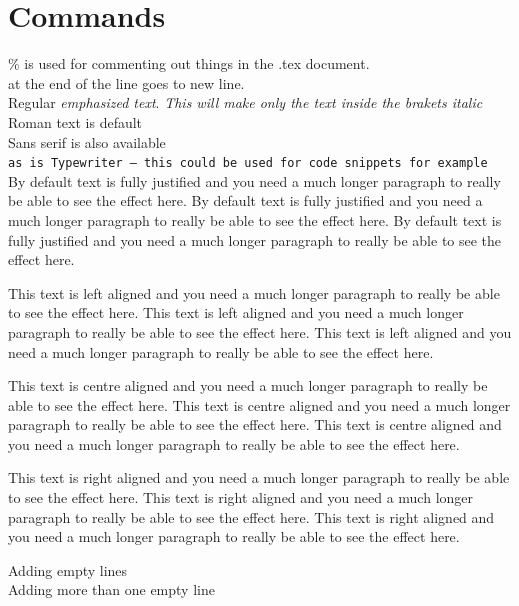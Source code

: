 \documentclass[16pt,a4paper]{article}
\begin{document}
\section{Commands}
\% is used for commenting out things in the .tex document.
\\ at the end of the line goes to new line. \\
Regular \emph{emphasized text}.
\textit{This will make only the \emph{text} inside the brakets italic}\\
\textrm{Roman text is default}\\ 
\textsf{Sans serif is also available}\\ 
\texttt{as is Typewriter – this could be used for code snippets for example}\\
By default text is fully justified and you need a much longer paragraph to really be able to see the effect here.
By default text is fully justified and you need a much longer paragraph to really be able to see the effect here.
By default text is fully justified and you need a much longer paragraph to really be able to see the effect here.
\begin{flushleft}
    This text is left aligned and you need a much longer paragraph to really be able to see the effect here.
    This text is left aligned and you need a much longer paragraph to really be able to see the effect here.
    This text is left aligned and you need a much longer paragraph to really be able to see the effect here.
\end{flushleft}
\begin{center}
    This text is centre aligned and you need a much longer paragraph to really be able to see the effect here.
    This text is centre aligned and you need a much longer paragraph to really be able to see the effect here.
    This text is centre aligned and you need a much longer paragraph to really be able to see the effect here.
\end{center}
\begin{flushright}
    This text is right aligned and you need a much longer paragraph to really be able to see the effect here.
    This text is right aligned and you need a much longer paragraph to really be able to see the effect here.
    This text is right aligned and you need a much longer paragraph to really be able to see the effect here.
\end{flushright}

Adding empty lines\\[\baselineskip]    
Adding more than one empty line\\[2\baselineskip]    
\end{document}
